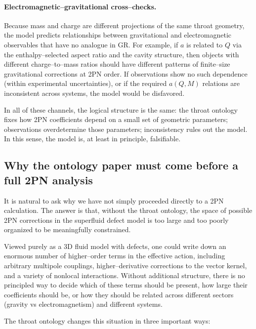 \documentclass[12pt]{article}
\begin{document}
\paragraph{Electromagnetic--gravitational cross--checks.}
Because mass and charge are different projections of the same throat
geometry, the model predicts relationships between gravitational and
electromagnetic observables that have no analogue in GR.  For example, if
$a$ is related to $Q$ via the enthalpy--selected aspect ratio and the cavity
structure, then objects with different charge--to--mass ratios should have
different patterns of finite--size gravitational corrections at 2PN order.
If observations show no such dependence (within experimental uncertainties),
or if the required $a(Q,M)$ relations are inconsistent across systems, the
model would be disfavored.

In all of these channels, the logical structure is the same: the throat
ontology fixes how 2PN coefficients depend on a small set of geometric
parameters; observations overdetermine those parameters; inconsistency
rules out the model.  In this sense, the model is, at least in principle,
falsifiable.

\subsection{Why the ontology paper must come before a full 2PN analysis}
\label{subsec:2pn_role}

It is natural to ask why we have not simply proceeded directly to a 2PN
calculation.  The answer is that, without the throat ontology, the space of
possible 2PN corrections in the superfluid defect model is too large and too
poorly organized to be meaningfully constrained.

Viewed purely as a 3D fluid model with defects, one could write down an
enormous number of higher--order terms in the effective action, including
arbitrary multipole couplings, higher--derivative corrections to the vector
kernel, and a variety of nonlocal interactions.  Without additional
structure, there is no principled way to decide which of these terms should
be present, how large their coefficients should be, or how they should be
related across different sectors (gravity vs electromagnetism) and different
systems.

The throat ontology changes this situation in three important ways:
\end{document}
